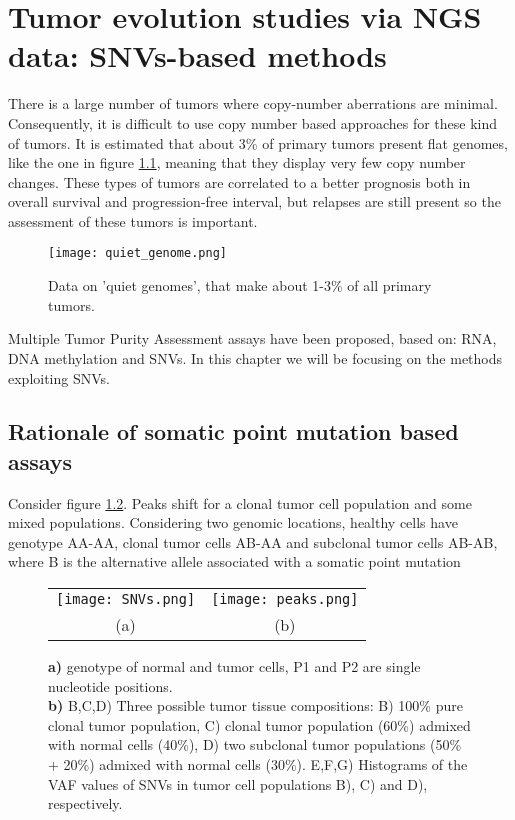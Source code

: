 \graphicspath{{chapters/TumorEvolution3Images/}}

\chapter{Tumor evolution studies via NGS data: SNVs-based methods}
There is a large number of tumors where copy-number aberrations are minimal.
Consequently, it is difficult to use copy number based approaches for these kind of tumors.
It is estimated that about 3\% of primary tumors present flat genomes, like the one in figure \ref{fig:quiet}, meaning that they display very few copy number changes.
These types of tumors are correlated to a better prognosis both in overall survival and progression-free interval, but relapses are still present so the assessment of these tumors is important.

\begin{figure}[H]
\centering
    \texttt{[image: quiet\_genome.png]}
    \caption{Data on 'quiet genomes', that make about 1-3\% of all primary tumors.}
    \label{fig:quiet}
\end{figure}

Multiple Tumor Purity Assessment assays have been proposed, based on: RNA, DNA methylation and SNVs.
In this chapter we will be focusing on the methods exploiting SNVs.

\section{Rationale of somatic point mutation based assays}
Consider figure \ref{fig:cluster}. Peaks shift for a clonal tumor cell population and some mixed populations. Considering two genomic locations, healthy cells have genotype AA-AA, clonal tumor cells AB-AA and subclonal tumor cells AB-AB, where B is the alternative allele associated with a somatic point mutation

\begin{figure}[H]
\centering
\begin{tabular}{cc}
  \texttt{[image: SNVs.png]} &   \texttt{[image: peaks.png]} \\
(a)  & (b)  \\[6pt]
\end{tabular}
\caption{\textbf{a)} genotype of normal and tumor cells, P1 and P2 are single nucleotide positions. \\
\textbf{b)} B,C,D) Three possible tumor tissue compositions: B)
100\% pure clonal tumor population, C) clonal tumor population (60\%) admixed with normal cells (40\%), D) two subclonal tumor
populations (50\% + 20\%) admixed with normal cells (30\%). E,F,G) Histograms of the VAF values of SNVs in tumor cell populations
B), C) and D), respectively.}
\label{fig:cluster}
\end{figure}

